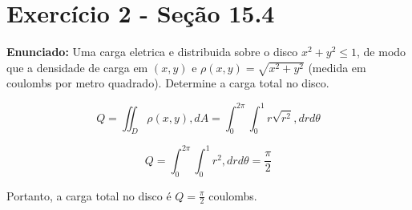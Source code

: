 \documentclass{article}
\begin{document}
\section*{Exercício 2 - Seção 15.4}

\textbf{Enunciado:} Uma carga eletrica e distribuida sobre o disco $x^2 + y^2 \leq 1$, de modo que a densidade de carga em $(x,y)$ e $\rho(x,y) = \sqrt{x^2 + y^2}$ (medida em coulombs por metro quadrado). Determine a carga total no disco.

\begin{equation*}
Q = \iint_D \rho(x,y) , dA = \int_{0}^{2\pi} \int_{0}^{1} r\sqrt{r^2} , dr d\theta
\end{equation*}

\begin{equation*}
Q = \int_{0}^{2\pi} \int_{0}^{1} r^2 , dr d\theta = \frac{\pi}{2}
\end{equation*}

Portanto, a carga total no disco é $Q = \frac{\pi}{2}$ coulombs.
\end{document}
